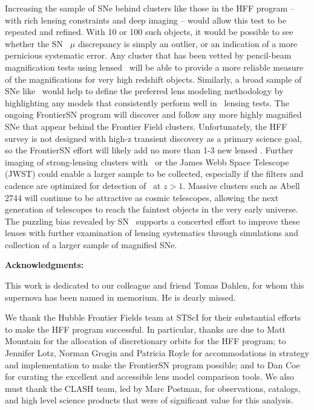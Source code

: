 Increasing the sample of SNe behind clusters like those in
the HFF program -- with rich lensing constraints and deep imaging -- 
would allow this test to be repeated and refined.  With 10 or 100 such
objects, it would be possible to see whether the SN \tomas\ $\mu$
discrepancy is simply an outlier, or an indication of a more
pernicious systematic error.  Any cluster that has been vetted by
pencil-beam magnification tests using lensed \SNIa\ will be able to
provide a more reliable measure of the magnifications for very high
redshift objects.  Similarly, a broad sample of SNe like \tomas\ would
help to define the preferred lens modeling methodology by highlighting
any models that consistently perform well in \SNIa\ lensing tests.
The ongoing FrontierSN program will discover and follow any more
highly magnified SNe that appear behind the Frontier Field
clusters. Unfortunately, the HFF survey is not designed with high-z
transient discovery as a primary science goal, so the FrontierSN
effort will likely add no more than 1-3 new lensed \SNIa. Further
imaging of strong-lensing clusters with \HST\ or the James Webb Space
Telescope (JWST) could enable a larger sample to be collected,
especially if the filters and cadence are optimized for detection
of \SNIa\ at $z>1$.  Massive clusters such as Abell 2744 will continue
to be attractive as cosmic telescopes, allowing the next generation of
telescopes to reach the faintest objects in the very early universe.
The puzzling bias revealed by SN \tomas\ supports a concerted effort
to improve these lenses with further examination of lensing
systematics through simulations and collection of a larger sample of
magnified SNe.


\bigskip


{\bf Acknowledgments:}

This work is dedicated to our colleague and friend Tomas Dahlen, for
whom this supernova has been named in memorium. He is dearly missed.

We thank the Hubble Frontier Fields team at STScI
for their substantial efforts to make the HFF program successful.  In
particular, thanks are due to Matt Mountain for the allocation of
discretionary orbits for the HFF program; to Jennifer Lotz, Norman
Grogin and Patricia Royle for accommodations in strategy and
implementation to make the FrontierSN program possible; and to Dan Coe
for curating the excellent and accessible lens model comparison tools.
We also must thank the CLASH team, led by Marc Postman, for
observations, catalogs, and high level science products that were of
significant value for this analysis.

